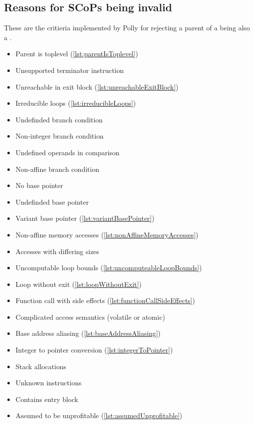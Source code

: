 \subsection{Reasons for SCoPs being invalid}
These are the critieria implemented by Polly for rejecting a parent of a \scop being also a \scop.
\begin{itemize}
    \item Parent is toplevel (\autoref{lst:parentIsToplevel})
    \item Unsupported terminator instruction
    \item Unreachable in exit block (\autoref{lst:unreachableExitBlock})
    \item Irreducible loops (\autoref{lst:irreducibleLoops})
    \item Undefinded branch condition
    \item Non-integer branch condition
    \item Undefined operands in comparison
    \item Non-affine branch condition
    \item No base pointer
    \item Undefinded base pointer
    \item Variant base pointer (\autoref{lst:variantBasePointer})
    \item Non-affine memory accesses (\autoref{lst:nonAffineMemoryAccesses})
    \item Accesses with differing sizes
    \item Uncomputable loop bounds (\autoref{lst:uncomputeableLoopBounds})
    \item Loop without exit (\autoref{lst:loopWithoutExit})
    \item Function call with side effects (\autoref{lst:functionCallSideEffects})
    \item Complicated access semantics (volatile or atomic)
    \item Base address aliasing (\autoref{lst:baseAddressAliasing})
    \item Integer to pointer conversion (\autoref{lst:integerToPointer})
    \item Stack allocations
    \item Unknown instructions
    \item Contains entry block
    \item Assumed to be unprofitable (\autoref{lst:assumedUnprofitable})
\end{itemize}

